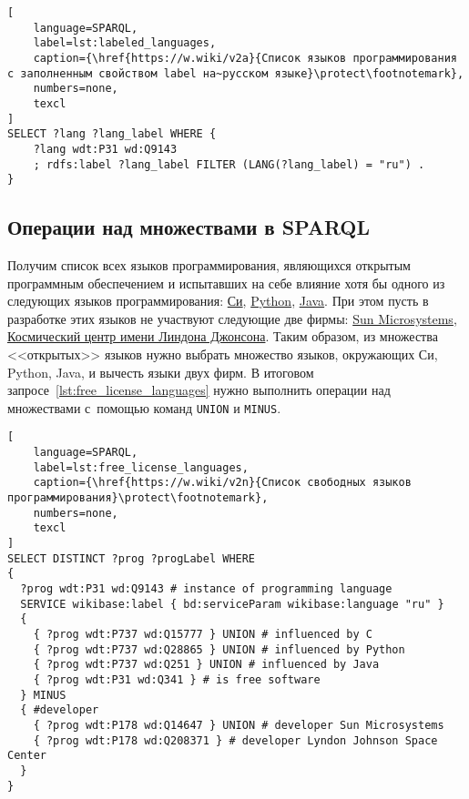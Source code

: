 \newpage
\begin{lstlisting}[
	language=SPARQL,
	label=lst:labeled_languages,
	caption={\href{https://w.wiki/v2a}{Список языков программирования с заполненным свойством label на~русском языке}\protect\footnotemark},
    numbers=none,
	texcl
]
SELECT ?lang ?lang_label WHERE {
    ?lang wdt:P31 wd:Q9143
    ; rdfs:label ?lang_label FILTER (LANG(?lang_label) = "ru") . 
}
\end{lstlisting}




\subsection{Операции над множествами в SPARQL}
Получим список всех языков программирования, 
являющихся открытым программным обеспечением %
и испытавших на себе влияние хотя бы одного из следующих языков программирования: 
\href{https://en.wikipedia.org/wiki/C_(programming_language)}{Си}, 
\href{https://ru.wikipedia.org/wiki/Python}{Python}, 
\href{https://ru.wikipedia.org/wiki/Java}{Java}. 
При этом пусть в разработке этих языков не участвуют следующие две фирмы: 
\href{https://ru.wikipedia.org/wiki/Sun_Microsystems}{Sun Microsystems}, 
\href{https://en.wikipedia.org/wiki/Johnson_Space_Center}{Космический центр имени Линдона Джонсона}. 
Таким образом, из множества <<открытых>> языков 
нужно выбрать множество языков, окружающих Си, Python, Java, 
и вычесть языки двух фирм. 
В итоговом запросе~\ref{lst:free_license_languages} 
нужно выполнить операции над множествами с~помощью команд \texttt{UNION} и \texttt{MINUS}. 


\begin{lstlisting}[
	language=SPARQL,
	label=lst:free_license_languages,
	caption={\href{https://w.wiki/v2n}{Список свободных языков программирования}\protect\footnotemark},
    numbers=none,
	texcl
]
SELECT DISTINCT ?prog ?progLabel WHERE
{
  ?prog wdt:P31 wd:Q9143 # instance of programming language
  SERVICE wikibase:label { bd:serviceParam wikibase:language "ru" } 
  {
    { ?prog wdt:P737 wd:Q15777 } UNION # influenced by C
    { ?prog wdt:P737 wd:Q28865 } UNION # influenced by Python
    { ?prog wdt:P737 wd:Q251 } UNION # influenced by Java
    { ?prog wdt:P31 wd:Q341 } # is free software
  } MINUS
  { #developer
    { ?prog wdt:P178 wd:Q14647 } UNION # developer Sun Microsystems
    { ?prog wdt:P178 wd:Q208371 } # developer Lyndon Johnson Space Center
  }
}
\end{lstlisting}



